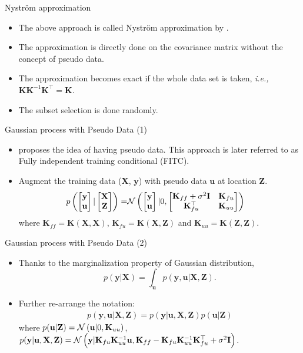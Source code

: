\documentclass[14pt,aspectratio=1610]{beamer}
\newcommand{\yV}{\mathbf{y}}
\newcommand{\xM}{\mathbf{X}}
\newcommand{\K}{\mathbf{K}}
\newcommand{\uV}{\mathbf{u}}
\newcommand{\zM}{\mathbf{Z}}
\newcommand{\I}{\mathbf{I}}
\newcommand{\ie}{\textit{i.e., }}
\begin{document}
\begin{frame}{Nystr\"{o}m approximation}
\begin{itemize}
\item The above approach is called Nystr\"{o}m approximation by \cite{WilliamsSeeger2001}.
\item The approximation is directly done on the covariance matrix without the concept of pseudo data.
\item The approximation becomes exact if the whole data set is taken, \ie $\K \K^{-1} \K^\top = \K$.
\item The subset selection is done randomly.
\end{itemize}
\end{frame}

\begin{frame}{Gaussian process with Pseudo Data (1)}
\begin{itemize}
\item \cite{SnelsonZoubin2006} proposes the idea of having pseudo data. This approach is later referred to as  
Fully independent training conditional (FITC).
\item Augment the training data ($\xM$, $\yV$) with pseudo data $\uV$ at location $\zM$.
\begin{align*}
p\left(\begin{bmatrix}
\yV \\ \uV \end{bmatrix}|\begin{bmatrix}
\xM \\ \zM \end{bmatrix} \right) =&  \gaussianDist{\begin{bmatrix}
\yV \\ \uV \end{bmatrix}}{0}{\begin{bmatrix}
\K_{ff}+\sigma^2\I & \K_{fu}  \\ \K_{fu}^\top & \K_{uu} \end{bmatrix}}
\end{align*}
where $\K_{ff} = \K(\xM, \xM)$, $\K_{fu} = \K(\xM, \zM)$ and $\K_{uu} = \K(\zM, \zM)$.
\end{itemize}
\end{frame}

\begin{frame}{Gaussian process with Pseudo Data (2)}
\begin{itemize}
\item Thanks to the marginalization property of Gaussian distribution,
\[
p(\yV| \xM) = \int_{\uV} p(\yV, \uV | \xM, \zM).
\]
\item Further re-arrange the notation:
\begin{align*}
p(\yV, \uV| \xM, \zM) = p(\yV| \uV, \xM, \zM) p(\uV| \zM)
\end{align*}
where $p(\uV| \zM) = \gaussianDist{\uV}{0}{\K_{uu}}$, 
$p(\yV| \uV, \xM, \zM)=\gaussianDist{\yV}{\K_{fu} \K_{uu}^{-1} \uV}{\K_{ff} - \K_{fu} \K_{uu}^{-1} \K_{fu}^\top+\sigma^2\I}$.
\end{itemize}
\end{frame}
\end{document}
